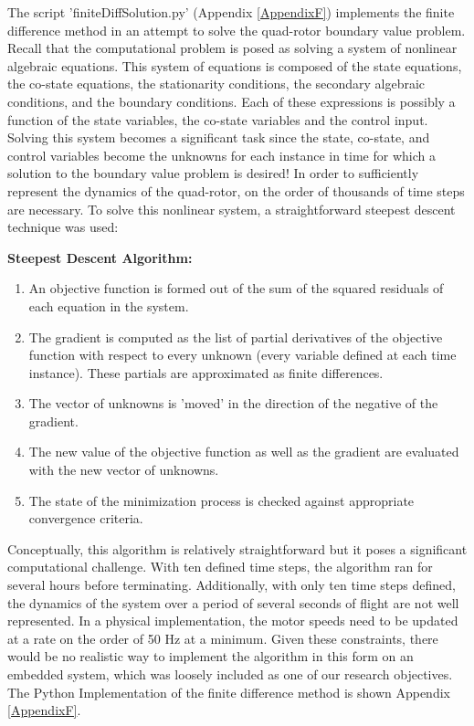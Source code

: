 The script 'finiteDiffSolution.py' (Appendix \ref{AppendixF}) implements the finite difference method in an attempt to solve the quad-rotor boundary value problem. Recall that the computational problem is posed as solving a system of nonlinear algebraic equations. This system of equations is composed of the state equations, the co-state equations, the stationarity conditions, the secondary algebraic conditions, and the boundary conditions. Each of these expressions is possibly a function of the state variables, the co-state variables and the control input. Solving this system becomes a significant task since the state, co-state, and control variables become the unknowns for each instance in time for which a solution to the boundary value problem is desired! In order to sufficiently represent the dynamics of the quad-rotor, on the order of thousands of time steps are necessary. To solve this nonlinear system, a straightforward steepest descent technique was used:


\begin{center}\textbf{Steepest Descent Algorithm:}\end{center}
\begin{enumerate}
    \item{An objective function is formed out of the sum of the squared residuals of each equation in the system.}
    \item{The gradient is computed as the list of partial derivatives of the objective function with respect to every unknown (every variable defined at each time instance). These partials are approximated as finite differences.}
    \item{The vector of unknowns is 'moved' in the direction of the negative of the gradient.}
    \item{The new value of the objective function as well as the gradient are evaluated with the new vector of unknowns. }
    \item{The state of the minimization process is checked against appropriate convergence criteria.}
\end{enumerate}



Conceptually, this algorithm is relatively straightforward but it poses a significant computational challenge. With ten defined time steps, the algorithm ran for several hours before terminating. Additionally, with only ten time steps defined, the dynamics of the system over a period of several seconds of flight are not well represented. In a physical implementation, the motor speeds need to be updated at a rate on the order of 50 Hz at a minimum. Given  these constraints, there would be no realistic way to implement the algorithm in this form on an embedded system, which was loosely included as one of our research objectives. The Python Implementation of the finite difference method is shown Appendix \ref{AppendixF}.

